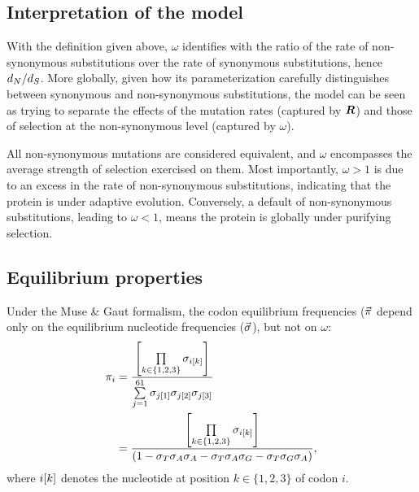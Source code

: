\subsection{Interpretation of the model}
\label{subsec:interpretation-of-the-model}

With the definition given above, $\omega$ identifies with the ratio of the rate of non-synonymous substitutions over the rate of synonymous substitutions, hence $d_N / d_S$.
More globally, given how its parameterization carefully distinguishes between synonymous and non-synonymous substitutions, the model can be seen as trying to separate the effects of the mutation rates (captured by $\bm{R}$) and those of selection at the non-synonymous level (captured by $\omega$).

All non-synonymous mutations are considered equivalent, and $\omega$ encompasses the average strength of selection exercised on them.
Most importantly, $\omega>1$ is due to an excess in the rate of non-synonymous substitutions, indicating that the protein is under adaptive evolution.
Conversely, a default of non-synonymous substitutions, leading to $\omega<1$, means the protein is globally under purifying selection.

\subsection{Equilibrium properties}
\label{subsec:equilibrium-properties}

Under the Muse \& Gaut formalism, the codon equilibrium frequencies ($\vec{\pi}$ depend only on the equilibrium nucleotide frequencies ($\vec{\sigma}$), but not on $\omega$:
\begin{align}
    \pi_{{i}} & = \dfrac{\left[\prod\limits_{k \in \{ 1, 2, 3 \}} \sigma_{{i}[k]}\right]}{\sum\limits_{{j}=1}^{61}\sigma_{{j}[1]}\sigma_{{j}[2]}\sigma_{{j}[3]} } \\
    & = \dfrac{\left[\prod\limits_{k \in \{ 1, 2, 3 \}} \sigma_{{i}[k]}\right]}{(1 - \sigma_{T}\sigma_{A}\sigma_{A} - \sigma_{T}\sigma_{A}\sigma_{G} - \sigma_{T}\sigma_{G}\sigma_{A} )}, \label{eq:equilibrium-MG}
\end{align}
where ${i}[k]$ denotes the nucleotide at position $k \in \{ 1, 2, 3 \}$ of codon $i$.

